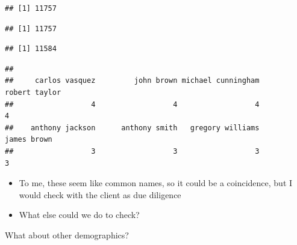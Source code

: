 \documentclass[
]{article}
\newenvironment{Shaded}{\begin{snugshade}}{\end{snugshade}}
\newcommand{\AttributeTok}[1]{\textcolor[rgb]{0.77,0.63,0.00}{#1}}
\newcommand{\ConstantTok}[1]{\textcolor[rgb]{0.00,0.00,0.00}{#1}}
\newcommand{\DecValTok}[1]{\textcolor[rgb]{0.00,0.00,0.81}{#1}}
\newcommand{\FunctionTok}[1]{\textcolor[rgb]{0.00,0.00,0.00}{#1}}
\newcommand{\NormalTok}[1]{#1}
\newcommand{\SpecialCharTok}[1]{\textcolor[rgb]{0.00,0.00,0.00}{#1}}
\begin{document}
\begin{verbatim}
## [1] 11757
\end{verbatim}

\begin{Shaded}
\end{Shaded}

\begin{verbatim}
## [1] 11757
\end{verbatim}

\begin{Shaded}
\end{Shaded}

\begin{verbatim}
## [1] 11584
\end{verbatim}

\begin{Shaded}
\end{Shaded}

\begin{verbatim}
## 
##     carlos vasquez         john brown michael cunningham      robert taylor 
##                  4                  4                  4                  4 
##    anthony jackson      anthony smith   gregory williams        james brown 
##                  3                  3                  3                  3
\end{verbatim}

\begin{itemize}
\item
  To me, these seem like common names, so it could be a coincidence, but
  I would check with the client as due diligence
\item
  What else could we do to check?
\end{itemize}

What about other demographics?
\end{document}
